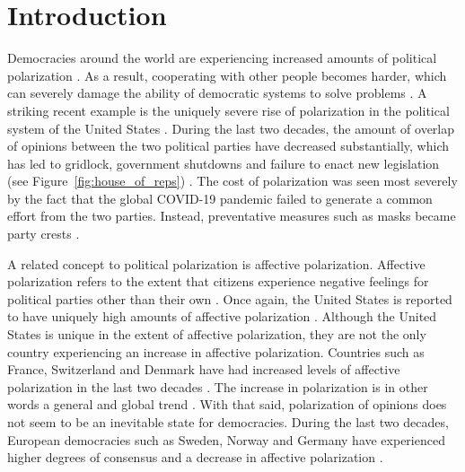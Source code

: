 \documentclass[11pt]{article}
\begin{document}
\part{Introduction}
\label{introduction}
Democracies around the world are experiencing increased amounts of political polarization \cite{boxell_cross-country_2020,mccoy_polarization_2018, somer_deja_2018}. 
As a result, cooperating with other people becomes harder, which can severely damage the ability of democratic systems to solve problems \cite{andris_rise_2015,levin_dynamics_2021,mccoy_polarization_2018}. 
A striking recent example is the uniquely severe rise of polarization in the political system of the United States \cite{dimock_america_2020}. 
During the last two decades, the amount of overlap of opinions between the two political parties have decreased substantially, which has led to gridlock, government shutdowns and failure to enact new legislation (see Figure~\ref{fig:house_of_reps}) \cite{andris_rise_2015, pew_research_center_political_2014-1}. The cost of polarization was seen most severely by the fact that the global COVID-19 pandemic failed to generate a common effort from the two parties. Instead, preventative measures such as masks became party crests \cite{macy2021polarization}.

A related concept to political polarization is affective polarization. Affective polarization refers to the extent that citizens experience negative feelings for political parties other than their own \cite{boxell_cross-country_2020, iyengar_origins_2019}. 
Once again, the United States is reported to have uniquely high amounts of affective polarization \cite{boxell_cross-country_2020}. 
Although the United States is unique in the extent of affective polarization, they are not the only country experiencing an increase in affective polarization. 
Countries such as France, Switzerland and Denmark have had increased levels of affective polarization in the last two decades \cite{boxell_cross-country_2020}. 
The increase in polarization is in other words a general and global trend \cite{mccoy_polarization_2018, somer_deja_2018, wilson_polarization_2020}. 
With that said, polarization of opinions does not seem to be an inevitable state for democracies. 
During the last two decades, European democracies such as Sweden, Norway and Germany have experienced higher degrees of consensus and a decrease in affective polarization \cite{boxell_cross-country_2020}. 
\end{document}
